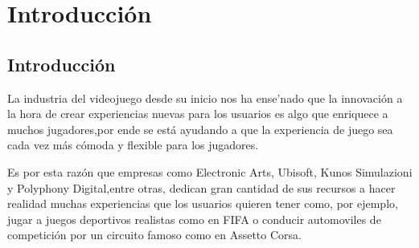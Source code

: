 %
%
%
%
%
%
%
%
%
%

\chapter{Introducci\'on}

\section{Introducci\'on}
\label{cap1:sec:introduccion}

La industria del videojuego desde su inicio nos ha ense'nado que la innovaci\'on
 a la hora de crear experiencias nuevas para los usuarios es algo que enriquece a muchos jugadores,por ende se est\'a ayudando a que
la experiencia de juego sea cada vez m\'as c\'omoda y flexible para los jugadores.

Es por esta raz\'on que empresas como Electronic Arts, Ubisoft, Kunos Simulazioni y Polyphony Digital,entre otras, dedican gran cantidad de sus recursos
a hacer realidad muchas experiencias que los usuarios quieren tener como, por ejemplo,
 jugar a juegos deportivos realistas como en FIFA o conducir automoviles de competici\'on por un circuito famoso como en Assetto Corsa.

